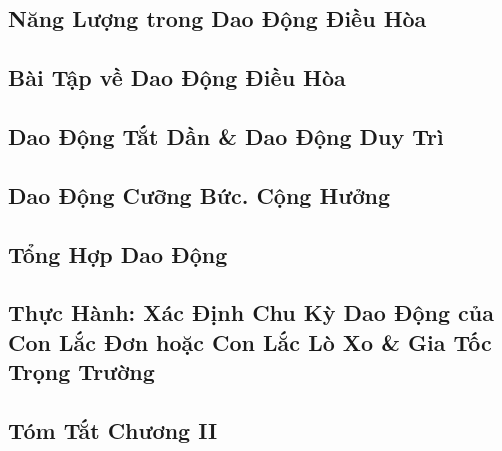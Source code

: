 \documentclass{article}
\numberwithin{equation}{section}
\begin{document}

\subsection{Năng Lượng trong Dao Động Điều Hòa}


\subsection{Bài Tập về Dao Động Điều Hòa}


\subsection{Dao Động Tắt Dần \& Dao Động Duy Trì}


\subsection{Dao Động Cưỡng Bức. Cộng Hưởng}


\subsection{Tổng Hợp Dao Động}


\subsection{Thực Hành: Xác Định Chu Kỳ Dao Động của Con Lắc Đơn hoặc Con Lắc Lò Xo \& Gia Tốc Trọng Trường}


\subsection{Tóm Tắt Chương II}
\end{document}
